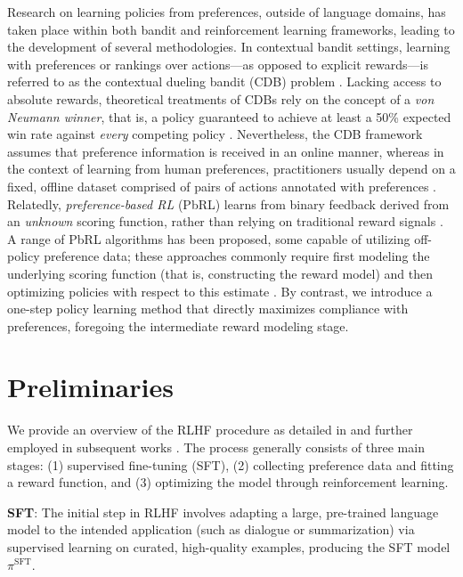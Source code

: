 Research on learning policies from preferences, outside of language domains, has taken place within both bandit and reinforcement learning frameworks, leading to the development of several methodologies. In contextual bandit settings, learning with preferences or rankings over actions—as opposed to explicit rewards—is referred to as the contextual dueling bandit (CDB) problem \citep{yue2012karmed,dudik2015contextual}. Lacking access to absolute rewards, theoretical treatments of CDBs rely on the concept of a \textit{von Neumann winner}, that is, a policy guaranteed to achieve at least a 50\% expected win rate against \textit{every} competing policy \citep{dudik2015contextual}. Nevertheless, the CDB framework assumes that preference information is received in an online manner, whereas in the context of learning from human preferences, practitioners usually depend on a fixed, offline dataset comprised of pairs of actions annotated with preferences \citep{yan2022human}. Relatedly, \textit{preference-based RL} (PbRL) learns from binary feedback derived from an \textit{unknown} scoring function, rather than relying on traditional reward signals \citep{BusaFekete2014,ruiz2023dueling}. A range of PbRL algorithms has been proposed, some capable of utilizing off-policy preference data; these approaches commonly require first modeling the underlying scoring function (that is, constructing the reward model) and then optimizing policies with respect to this estimate \citep{jain2013learning,BusaFekete2014,christiano2017deep,sadigh2017active,kupcsik2018learning}. By contrast, we introduce a one-step policy learning method that directly maximizes compliance with preferences, foregoing the intermediate reward modeling stage.

\section{Preliminaries}\label{section:prelims}

We provide an overview of the RLHF procedure as detailed in \citeauthor{ziegler2020finetuning} and further employed in subsequent works \citep{stiennon2022learning, bai2022training, ouyang2022training}. The process generally consists of three main stages: (1) supervised fine-tuning (SFT), (2) collecting preference data and fitting a reward function, and (3) optimizing the model through reinforcement learning.

\textbf{SFT}: The initial step in RLHF involves adapting a large, pre-trained language model to the intended application (such as dialogue or summarization) via supervised learning on curated, high-quality examples, producing the SFT model $\pi^\text{SFT}$.

